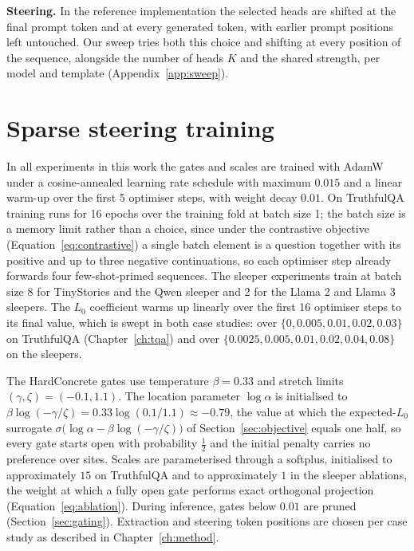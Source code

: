 \documentclass[logo,msc,notimes]{infthesis}
\begin{document}
\textbf{Steering.} In the reference implementation the selected heads are shifted at the final
prompt token and at every generated token, with earlier prompt positions left untouched. Our sweep
tries both this choice and shifting at every position of the sequence, alongside the number of
heads $K$ and the shared strength, per model and template (Appendix~\ref{app:sweep}).

\section{Sparse steering training}\label{app:training}
In all experiments in this work the gates and scales are trained with AdamW under a cosine-annealed learning
rate schedule with maximum $0.015$ and a linear warm-up over the first 5 optimiser steps, with
weight decay $0.01$. On TruthfulQA training runs for 16 epochs over the training fold at batch
size 1; the batch size is a memory limit rather than a choice, since under the contrastive
objective (Equation~\ref{eq:contrastive}) a single batch element is a question together with its
positive and up to three negative continuations, so each optimiser step already forwards four
few-shot-primed sequences. The sleeper experiments train at batch size 8 for TinyStories and
the Qwen sleeper and 2 for the Llama 2 and Llama 3 sleepers. The $L_0$ coefficient warms up
linearly over the first 16 optimiser steps to its final value, which is swept in both case
studies: over $\{0, 0.005, 0.01, 0.02, 0.03\}$ on TruthfulQA (Chapter~\ref{ch:tqa}) and over
$\{0.0025, 0.005, 0.01, 0.02, 0.04, 0.08\}$ on the sleepers.

The HardConcrete gates use temperature $\beta=0.33$ and stretch limits
$(\gamma,\zeta)=(-0.1,1.1)$. The location parameter $\log\alpha$ is initialised to
$\beta\log(-\gamma/\zeta) = 0.33\log(0.1/1.1) \approx -0.79$, the value at which the
expected-$L_0$ surrogate $\sigma\big(\log\alpha - \beta\log(-\gamma/\zeta)\big)$ of
Section~\ref{sec:objective} equals one half, so every gate starts open with probability
$\tfrac{1}{2}$ and the initial penalty carries no preference over sites. Scales are parameterised
through a softplus, initialised to approximately $15$ on TruthfulQA and to approximately $1$ in
the sleeper ablations, the weight at which a fully open gate performs exact orthogonal projection
(Equation~\ref{eq:ablation}). During inference, gates below $0.01$ are
pruned (Section~\ref{sec:gating}). Extraction and steering token positions are chosen per case
study as described in Chapter~\ref{ch:method}.
\end{document}
